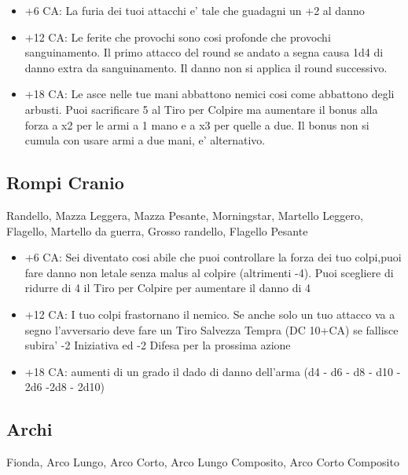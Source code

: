 \documentclass[a4paper,11pt,twoside,openany]{dndbook}
\begin{document}
\begin{itemize}

\item +6 CA: La furia dei tuoi attacchi e' tale che guadagni un +2 al danno

\item +12 CA: Le ferite che provochi sono cosi profonde che provochi sanguinamento. Il primo attacco del round se andato a segna causa 1d4 di danno extra da sanguinamento. Il danno non si applica il round successivo.

\item +18 CA: Le asce nelle tue mani abbattono nemici cosi come abbattono degli arbusti. Puoi sacrificare 5 al Tiro per Colpire ma aumentare il bonus alla forza a x2 per le armi a 1 mano e a x3 per quelle a due. Il bonus non si cumula con usare armi a due mani, e' alternativo.

\end{itemize}

\subsection{Rompi Cranio} Randello, Mazza Leggera, Mazza Pesante, Morningstar,
Martello Leggero, Flagello, Martello da guerra, Grosso randello, Flagello
Pesante

\begin{itemize}
	\item +6 CA: Sei diventato cosi abile che puoi controllare la forza dei tuo colpi,puoi fare danno non letale senza malus al colpire (altrimenti -4). Puoi scegliere di ridurre di 4 il Tiro per Colpire per aumentare il danno di 4 
	
	\item +12 CA: I tuo colpi frastornano il nemico. Se anche solo un tuo attacco va a segno l'avversario deve fare un Tiro Salvezza Tempra (DC 10+CA) se fallisce subira' -2 Iniziativa ed -2 Difesa per la prossima azione 
	
	\item +18 CA: aumenti di un grado il dado di danno dell'arma (d4 - d6 - d8 - d10 - 2d6 -2d8 - 2d10)
\end{itemize}

\subsection{Archi} Fionda, Arco Lungo, Arco Corto, Arco Lungo Composito, Arco Corto Composito
\end{document}
